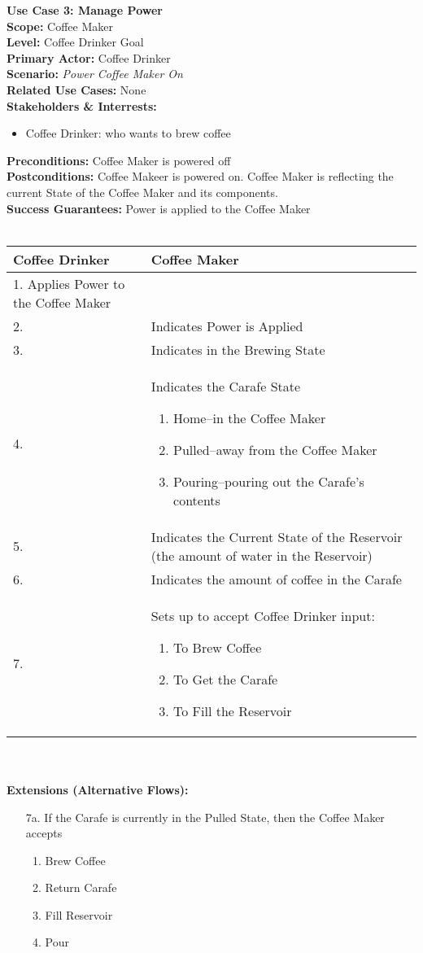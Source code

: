 \documentclass[letterpaper]{article}
\begin{document}
\noindent
\textbf{Use Case 3: Manage Power}\\
\textbf{Scope:  }Coffee Maker\\
\textbf{Level:  }Coffee Drinker Goal\\
\textbf{Primary Actor:  }Coffee Drinker\\
\textbf{Scenario: }\textit{Power Coffee Maker On}\\
\textbf{Related Use Cases:  }None\\
\textbf{Stakeholders \& Interrests:  }
\begin{itemize}
\item Coffee Drinker:  who wants to brew coffee
\end{itemize}
\textbf{Preconditions:  }Coffee Maker is powered off\\
\textbf{Postconditions:  }Coffee Makeer is powered on.  Coffee Maker
is reflecting the current State of the Coffee Maker and its
components.\\
\textbf{Success Guarantees:  }Power is applied to the Coffee Maker\\\\
\begin{tabular}{|p{5.75cm}|p{5.75cm}|}\hline
\textbf{Coffee Drinker} & \textbf{Coffee Maker}\\\hline
1.  Applies Power to the Coffee Maker & \\\hline
2. & Indicates Power is Applied\\\hline
3. & Indicates in the Brewing State\\\hline
4. & Indicates the Carafe State
\begin{enumerate}
\item Home--in the Coffee Maker
\item Pulled--away from the Coffee Maker
\item Pouring--pouring out the Carafe's contents
\end{enumerate}
\\\hline
5. & Indicates the Current State of the Reservoir (the amount of
water in the Reservoir)\\\hline
6. & Indicates the amount of coffee in the Carafe\\\hline
7. & Sets up to accept Coffee Drinker input:
\begin{enumerate}
\item To Brew Coffee
\item To Get the Carafe
\item To Fill the Reservoir
\end{enumerate}
\\\hline
\end{tabular}\\\\
\textbf{Extensions (Alternative Flows):}
\begin{itemize}
\item[7a.]If the Carafe is currently in the Pulled State, then the
Coffee Maker accepts
\begin{enumerate}
\item Brew Coffee
\item Return Carafe
\item Fill Reservoir
\item Pour
\end{enumerate}
\end{itemize}
\end{document}
